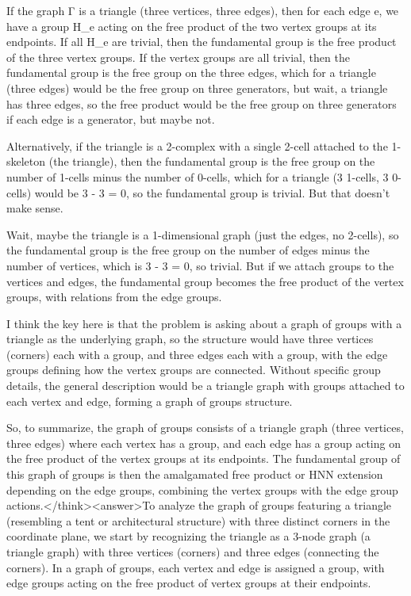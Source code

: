 If the graph Γ is a triangle (three vertices, three edges), then for each edge e, we have a group H_e acting on the free product of the two vertex groups at its endpoints. If all H_e are trivial, then the fundamental group is the free product of the three vertex groups. If the vertex groups are all trivial, then the fundamental group is the free group on the three edges, which for a triangle (three edges) would be the free group on three generators, but wait, a triangle has three edges, so the free product would be the free group on three generators if each edge is a generator, but maybe not.

Alternatively, if the triangle is a 2-complex with a single 2-cell attached to the 1-skeleton (the triangle), then the fundamental group is the free group on the number of 1-cells minus the number of 0-cells, which for a triangle (3 1-cells, 3 0-cells) would be 3 - 3 = 0, so the fundamental group is trivial. But that doesn't make sense.

Wait, maybe the triangle is a 1-dimensional graph (just the edges, no 2-cells), so the fundamental group is the free group on the number of edges minus the number of vertices, which is 3 - 3 = 0, so trivial. But if we attach groups to the vertices and edges, the fundamental group becomes the free product of the vertex groups, with relations from the edge groups.

I think the key here is that the problem is asking about a graph of groups with a triangle as the underlying graph, so the structure would have three vertices (corners) each with a group, and three edges each with a group, with the edge groups defining how the vertex groups are connected. Without specific group details, the general description would be a triangle graph with groups attached to each vertex and edge, forming a graph of groups structure.

So, to summarize, the graph of groups consists of a triangle graph (three vertices, three edges) where each vertex has a group, and each edge has a group acting on the free product of the vertex groups at its endpoints. The fundamental group of this graph of groups is then the amalgamated free product or HNN extension depending on the edge groups, combining the vertex groups with the edge group actions.</think><answer>To analyze the graph of groups featuring a triangle (resembling a tent or architectural structure) with three distinct corners in the coordinate plane, we start by recognizing the triangle as a 3-node graph (a triangle graph) with three vertices (corners) and three edges (connecting the corners). In a graph of groups, each vertex and edge is assigned a group, with edge groups acting on the free product of vertex groups at their endpoints.  

